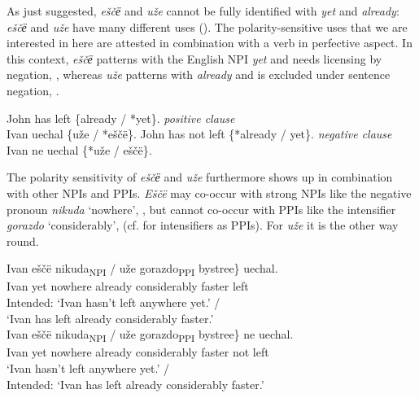 \documentclass[output=paper,colorlinks,citecolor=brown]{langscibook}
\begin{document}
As just suggested, \textit{eščё} and \textit{uže} cannot be fully identified with \textit{yet} and \textit{already}: \textit{eščё} and \textit{uže} have many different uses (\citealt{Boguslavskij1996}). The polarity-sensitive uses that we are interested in here are attested in combination with a verb in perfective aspect. In this context, \textit{eščё} patterns with the English NPI \textit{yet} and needs licensing by negation, , whereas \textit{uže} patterns with \textit{already} and is excluded under sentence negation, .

\eanoraggedright\label{geist-repp:ex:John.has.left.1}
John has left \{already / *yet\}.	\hfill \textit{positive clause} \\
Ivan uechal  \{uže / *eščë\}.
\ex\label{geist-repp:ex:John.has.left.2}
John has not left \{*already / yet\}. \hfill \textit{negative clause}  \\
Ivan ne uechal \{*uže  / eščë\}.
\z

\noindent The polarity sensitivity of \textit{eščё} and \textit{uže} furthermore shows up in combination with other NPIs and PPIs. \textit{Eščë} may co-occur with strong NPIs like the negative pronoun \textit{nikuda} ‘nowhere’, , but cannot co-occur with PPIs like the intensifier \textit{gorazdo} ‘considerably’,  (cf. \citealt{vanderWouden1997} for intensifiers as PPIs). For \textit{uže} it is the other way round.

\ea\label{geist-repp:ex:Ivan.ezdil.1}
\gll Ivan \minsp{\{*} eščë nikuda\textsubscript{NPI} /  uže gorazdo\textsubscript{PPI} bystree\} uechal.\\
Ivan {} yet nowhere {} {} already considerably faster left\\
\glt Intended: ‘Ivan hasn’t left anywhere yet.’ /\\‘Ivan has left already considerably faster.’ \\
\ex\label{geist-repp:ex:Ivan.ezdil.2}
\gll Ivan  eščë nikuda\textsubscript{NPI} / \minsp{*} uže gorazdo\textsubscript{PPI} bystree\} ne uechal.\\
Ivan {} yet nowhere {} {} already considerably faster not left\\
\glt‘Ivan hasn’t left anywhere yet.’ /\\Intended: ‘Ivan has left already considerably faster.’\\
\z
\end{document}
